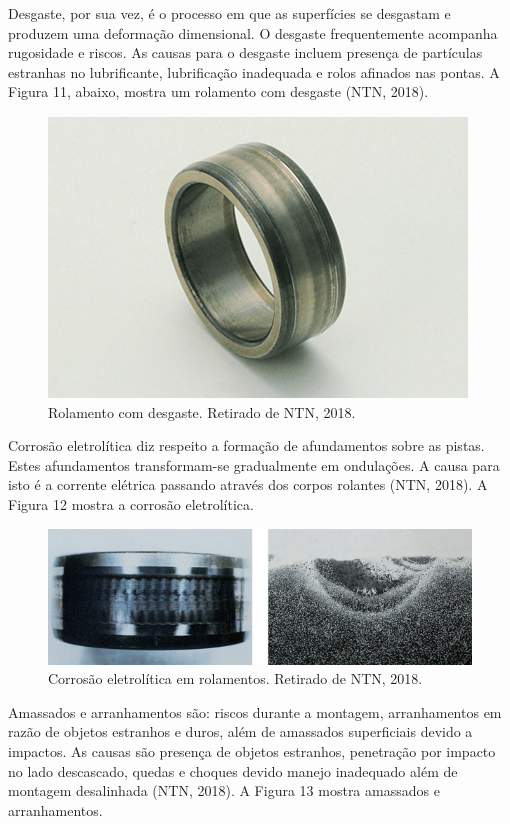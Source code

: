 \documentclass[
	12pt,				
	oneside,			
	a4paper,			
	english,			
	brazil				
	]{abntex2ppgsi}
\begin{document}
Desgaste, por sua vez, é o processo em que as superfícies se desgastam e produzem uma deformação dimensional. O desgaste frequentemente acompanha rugosidade e riscos. As causas para o desgaste incluem presença de partículas estranhas no lubrificante, lubrificação inadequada e rolos afinados nas pontas. A Figura 11, abaixo, mostra um rolamento com desgaste (NTN, 2018).

\begin{figure}[!htb]
\centering
\includegraphics{Figura11}
\caption {Rolamento com desgaste. Retirado de NTN, 2018.}
\label{Figura11}
\end{figure}

Corrosão eletrolítica diz respeito a formação de afundamentos sobre as pistas. Estes afundamentos transformam-se gradualmente em ondulações. A causa para isto é a corrente elétrica passando através dos corpos rolantes (NTN, 2018). A Figura 12 mostra a corrosão eletrolítica. 

\begin{figure}[!htb]
\centering
\includegraphics{Figura12}
\caption {Corrosão eletrolítica em rolamentos. Retirado de NTN, 2018.}
\label{Figura12}
\end{figure}

Amassados e arranhamentos são: riscos durante a montagem, arranhamentos em razão de objetos estranhos e duros, além de amassados superficiais devido a impactos. As causas são presença de objetos estranhos, penetração por impacto no lado descascado, quedas e choques devido manejo inadequado além de montagem desalinhada (NTN, 2018). A Figura 13 mostra amassados e arranhamentos. 
\end{document}
